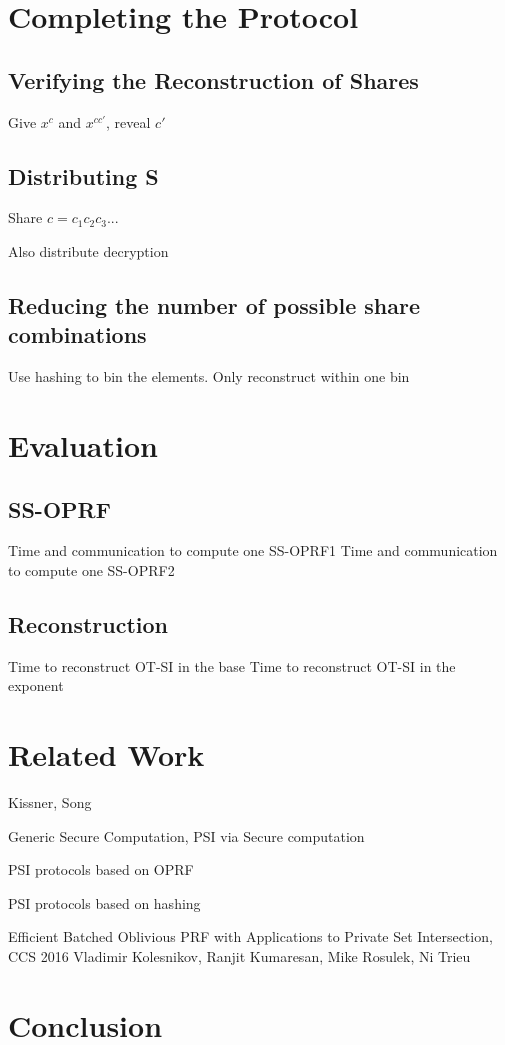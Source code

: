 \documentclass[10pt, sigconf]{acmart}
\begin{document}
\section{Completing the Protocol}

\subsection{Verifying the Reconstruction of Shares}

Give $x^c$ and $x^{cc'}$, reveal $c'$

\subsection{Distributing S}

Share $c = c_1 c_2 c_3 ...$

Also distribute decryption

\subsection{Reducing the number of possible share combinations}

Use hashing to bin the elements.  Only reconstruct within one bin

\section{Evaluation}

\subsection{SS-OPRF}

Time and communication to compute one SS-OPRF1
Time and communication to compute one SS-OPRF2

\subsection{Reconstruction}

Time to reconstruct OT-SI in the base
Time to reconstruct OT-SI in the exponent

\section{Related Work}

Kissner, Song

Generic Secure Computation, PSI via Secure computation

PSI protocols based on OPRF

PSI protocols based on hashing




Efficient Batched Oblivious PRF with Applications to Private Set Intersection, CCS 2016 Vladimir Kolesnikov, Ranjit  Kumaresan, Mike Rosulek, Ni Trieu





\section{Conclusion}



\end{document}
